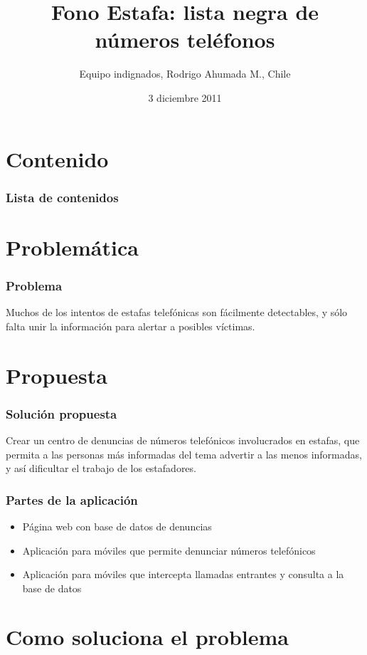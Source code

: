 \documentclass{beamer}
\title[Fono Estafa]{Fono Estafa: lista negra de números teléfonos}
\author[Rodrigo Ahumada M.]{Equipo indignados, Rodrigo Ahumada M., Chile}
\date[]{3 diciembre 2011}
\begin{document}
\frame{\titlepage}

\section*{Contenido}
\frame
{
	\frametitle{Lista de contenidos}
	\tableofcontents
}


\section{Problemática}
\frame
{
	\frametitle{Problema}
	
	Muchos de los intentos de estafas telefónicas son fácilmente detectables, y sólo
	falta unir la información para alertar a posibles víctimas.
}


\section{Propuesta}
\frame
{
	\frametitle{Solución propuesta}

	Crear un centro de denuncias de números telefónicos involucrados en estafas,
	que permita a las personas más informadas del tema advertir a las menos informadas,
	y así dificultar el trabajo de los estafadores.
}


\frame
{
	\frametitle{Partes de la aplicación}

	\begin{itemize}
	\pause
	\item Página web con base de datos de denuncias
	\pause
	\item Aplicación para móviles que permite denunciar números telefónicos
	\pause
	\item Aplicación para móviles que intercepta llamadas entrantes y consulta a la base de datos
	\end{itemize}
}


\section{Como soluciona el problema}
\end{document}
